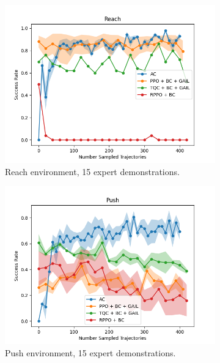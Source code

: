 \begin{figure}[htbp]
    \centering
    \begin{subfigure}[t]{0.3\textwidth}
      \includegraphics[width=\textwidth]{images/15_400/Reach.png}
      \caption{Reach environment, 15 expert demonstrations.}
      \label{fig:plot2}
    \end{subfigure}
    \begin{subfigure}[t]{0.3\textwidth}
      \includegraphics[width=\textwidth]{images/15_400/Push.png}
      \caption{Push environment, 15 expert demonstrations.}
      \label{fig:plot3}
    \end{subfigure}
    \begin{subfigure}[t]{0.3\textwidth}

\end{subfigure}
\end{figure}

